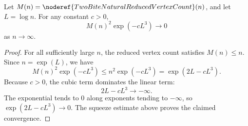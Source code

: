 \begin{lemma}
Let \(M(n)=\noderef{TwoBiteNaturalReducedVertexCount}(n)\), and let
\(L=\log n\).  For any constant \(c>0\),
\[
M(n)^2\exp(-cL^3)\to0
\]
as \(n\to\infty\).
\end{lemma}
\begin{proof}
For all sufficiently large \(n\), the reduced vertex count satisfies
\(M(n)\le n\).  Since \(n=\exp(L)\), we have
\[
M(n)^2\exp(-cL^3)\le n^2\exp(-cL^3)=\exp(2L-cL^3).
\]
Because \(c>0\), the cubic term dominates the linear term:
\[
2L-cL^3\to-\infty .
\]
The exponential tends to \(0\) along exponents tending to \(-\infty\), so
\(\exp(2L-cL^3)\to0\).  The squeeze estimate above proves the claimed
convergence.
\end{proof}

